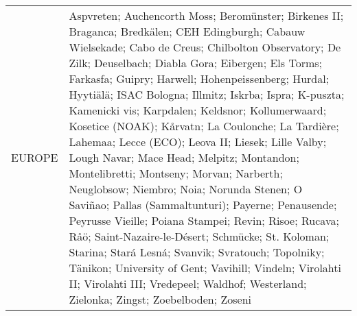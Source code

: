 \begin{table}
\begin{tabularx}{\textwidth}{lX}
  EUROPE   & Aspvreten; Auchencorth Moss; Beromünster; Birkenes II; Braganca; Bredkälen; CEH Edingburgh; Cabauw Wielsekade; Cabo de Creus; Chilbolton Observatory; De Zilk; Deuselbach; Diabla Gora; Eibergen; Els Torms; Farkasfa; Guipry; Harwell; Hohenpeissenberg; Hurdal; Hyytiälä; ISAC Bologna; Illmitz; Iskrba; Ispra; K-puszta; Kamenicki vis; Karpdalen; Keldsnor; Kollumerwaard; Kosetice (NOAK); Kårvatn; La Coulonche; La Tardière; Lahemaa; Lecce (ECO); Leova II; Liesek; Lille Valby; Lough Navar; Mace Head; Melpitz; Montandon; Montelibretti; Montseny; Morvan; Narberth; Neuglobsow; Niembro; Noia; Norunda Stenen; O Saviñao; Pallas (Sammaltunturi); Payerne; Penausende; Peyrusse Vieille; Poiana Stampei; Revin; Risoe; Rucava; Råö; Saint-Nazaire-le-Désert; Schmücke; St. Koloman; Starina; Stará Lesná; Svanvik; Svratouch; Topolniky; Tänikon; University of Gent; Vavihill; Vindeln; Virolahti II; Virolahti III; Vredepeel; Waldhof; Westerland; Zielonka; Zingst; Zoebelboden; Zoseni                                                                                                                                                                                                                                                                                                                                                                                                                                                                                                                                                                                                                                                                                                                                                                                                                                                                                                                                                                                                         \\

\end{tabularx}
\end{table}
